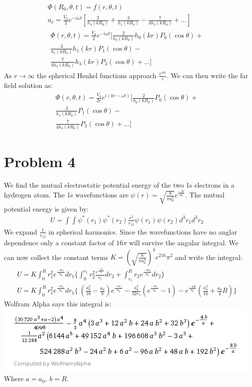 \documentclass[a4paper,12pt]{article}
\numberwithin{equation}{section}
\begin{document}
\begin{gather}
 \Phi(R_0,\theta, t) = f(r,\theta, t)\\
 a_{\ell}=\frac{V_0}{2}e^{-i\omega t}[\frac{2}{h_0(kR_0)}+\frac{3}{h_1(kR_0)}-\frac{7}{4h_3(kR_0)}+\ldots]\\
 \begin{aligned}
 \Phi(r,\theta,t)=\frac{V_0}{2}e^{-i\omega t}[\frac{2}{h_0(kR_0)}h_0(kr)P_0(\cos \theta)+ \\
	      \frac{3}{h_1(kR_0)}h_1(kr)P_1(\cos \theta)-\\ 
	      \frac{7}{4h_3(kR_0)}h_3(kr)P_3(\cos \theta)+\ldots]
 \end{aligned}
\end{gather}
As $r\rightarrow \infty$ the spherical Henkel functions approach $\frac{e^{ikr}}{r}$. 
We can then write the far field solution as:
\begin{gather}
  \begin{aligned}
 \Phi(r,\theta,t)=\frac{V_0}{2r}e^{i(kr-\omega t)}[\frac{2}{h_0(kR_0)}P_0(\cos \theta)+ \\
	      \frac{3}{h_1(kR_0)}P_1(\cos \theta)-\\ 
	      \frac{7}{4h_3(kR_0)}P_3(\cos \theta)+\ldots]
 \end{aligned}
\end{gather}


\section{Problem 4}
We find the mutual electrostatic potential energy of the two 1s electrons in a hydrogen atom.
The 1s wavefunctions are $\psi(r)=\sqrt{\frac{8}{\pi a_0^3}}e^{\frac{-2r}{a_0}}$.
The mutual potential energy is given by:
\begin{gather}
 U=\int\int\psi^*(r_1)\psi^*(r_2)\frac{e^2}{r_{12}}\psi(r_1)\psi(r_2) d^3r_1 d^3r_2
\end{gather}
We expand $\frac{1}{r_{12}}$ in spherical harmonics. 
Since the wavefunctions have no anglar dependence only a constant factor of $16\pi$ will survive the angular integral.
We can now collect the constant terms $K=(\sqrt{\frac{8}{\pi a_0^3}})^4e^216\pi^2$ and write the integral:
\begin{gather}
 U=K \int_{0}^{R} r_1^2 e^{\frac{-4r_1}{a_0}}dr_1\{\int_{0}^{r_1} r_2^2\frac{ e^{\frac{-4r_2}{a_0}} }{r_1} dr_2
 + \int_{r_1}^{R} r_2 e^{\frac{-4r_2}{a_0}}  dr_2\}\\
 U=K \int_{0}^{R} r_1^2 e^{\frac{-4r_1}{a_0}}dr_1\{\ (\frac{a_0^2}{16}-\frac{a_0}{8} )e^{\frac{-4r_1}{a_0}} 
 -\frac{a_0^3}{32r_1}(e^{\frac{-4r_1}{a_0}}-1 )-e^{\frac{-4R}{a_0}}(\frac{a_0^2}{16}+\frac{a_0}{4}R) \}
\end{gather}
Wolfram Alpha says this integral is:\\
\includegraphics{BigEq2}
\\
Where $a=a_0,\ b=R$.
\end{document}
